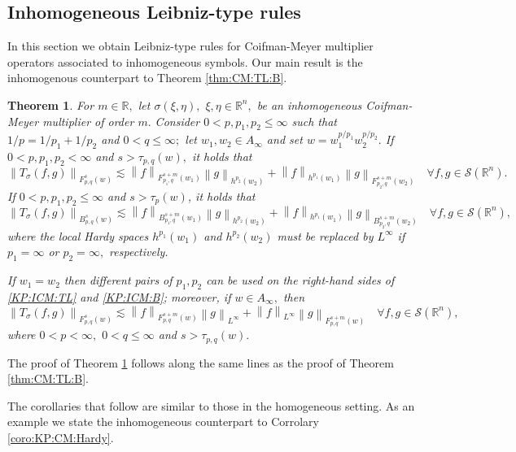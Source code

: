 \documentclass[10pt,a4paper]{article}
\newtheorem{theorem}{Theorem}[section]
\theoremstyle{remark}
\newcommand{\re}{\mathbb{R}}
\newcommand{\rn}{{{\mathbb R}^n}}
\newcommand{\sw}{{\mathcal{S}}(\rn)}
\newcommand{\itlw}[4]{F_{#1,#3}^{#2}(#4)} %
\newcommand{\ibesw}[4]{B_{#1,#3}^{#2}(#4)} %
\newcommand{\norm}[2]{\left\|#1\right\|_{#2}}
\newcommand{\hcline}{1/p=1/p_1+1/p_2}
\begin{document}
 \subsection{Inhomogeneous Leibniz-type rules}
 In this section we obtain Leibniz-type rules for Coifman-Meyer multiplier operators associated to inhomogeneous symbols. Our main result is the inhomogenous counterpart to Theorem \ref{thm:CM:TL:B}. 
 
\begin{theorem}\label{thm:ICM:TL:B}  For $m \in \re,$ let $\sigma(\xi,\eta),$ $\xi,\eta\in\rn,$ be an inhomogeneous Coifman-Meyer multiplier of order $m.$ Consider  $0 < p, p_1, p_2  \le \infty$  such that $\hcline$ and  $0 < q \leq \infty;$ let  $w_1,w_2\in A_\infty$ and set $w=w_1^{{p}/{p_1}} w_2^{{p}/{p_2}}.$ 
If $0 < p,p_1,p_2 < \infty$ and  $s > \tau_{p,q}(w),$  it holds that
\begin{equation}\label{KP:ICM:TL}
\norm{T_\sigma(f,g)}{\itlw{p}{s}{q}{w}} \lesssim \norm{f}{\itlw{p_1}{s+m}{q}{w_1}} \norm{g}{h^{p_2}(w_2)} +  \norm{f}{h^{p_1}(w_1)}   \norm{g}{\itlw{p_2}{s+m}{q}{w_2}} \quad \forall f, g \in \sw.
\end{equation}
If $0< p, p_1,p_2\leq \infty$ and $s > \tau_p(w)$, it holds that
\begin{equation}\label{KP:ICM:B}
\norm{T_\sigma(f,g)}{\ibesw{p}{s}{q}{w}} \lesssim \norm{f}{\ibesw{p_1}{s+m}{q}{w_1} } \norm{g}{h^{p_2}(w_2)} +  \norm{f}{h^{p_1}(w_1)}   \norm{g}{\ibesw{p_2}{s+m}{q}{w_2} } \quad \forall f, g \in \sw,
\end{equation}
where the local Hardy spaces $h^{p_1}(w_1)$ and $h^{p_2}(w_2)$ must be replaced by $L^\infty$ if $p_1=\infty$ or $p_2=\infty,$ respectively.

If $w_1=w_2$ then different pairs of $p_1, p_2$ can be used on the right-hand sides of \eqref{KP:ICM:TL} and \eqref{KP:ICM:B}; moreover, if $w\in A_\infty,$ then 
\begin{equation*}
\norm{T_\sigma(f,g)}{\itlw{p}{s}{q}{w}} \lesssim \norm{f}{\itlw{p}{s+m}{q}{w} } \norm{g}{L^\infty} +  \norm{f}{L^\infty}   \norm{g}{\itlw{p}{s+m}{q}{w}} \quad \forall f, g \in \sw,
\end{equation*}
where $0<p<\infty,$ $0<q\le\infty$ and $s>\tau_{p,q}(w).$
\end{theorem} 

The proof of Theorem \ref{thm:ICM:TL:B} follows along the same lines as the proof of Theorem \ref{thm:CM:TL:B}. 
 
The corollaries that follow are similar to those in the homogeneous setting. As an example we state the inhomogeneous counterpart to Corrolary \ref{coro:KP:CM:Hardy}.
 
\end{document}
